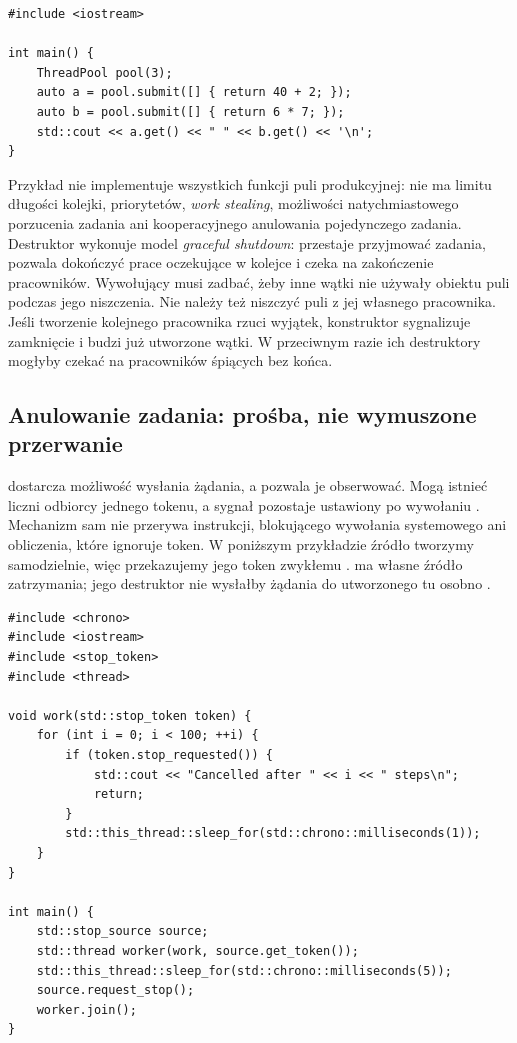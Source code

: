 \begin{lstlisting}[caption={Użycie puli i odbiór wyników; dołącz do programu z klasą ThreadPool.}]
#include <iostream>

int main() {
    ThreadPool pool(3);
    auto a = pool.submit([] { return 40 + 2; });
    auto b = pool.submit([] { return 6 * 7; });
    std::cout << a.get() << " " << b.get() << '\n';
}
\end{lstlisting}

Przykład nie implementuje wszystkich funkcji puli produkcyjnej:
nie ma limitu długości kolejki, priorytetów, \emph{work stealing},
możliwości natychmiastowego porzucenia zadania ani kooperacyjnego
anulowania pojedynczego zadania. Destruktor wykonuje model
\emph{graceful shutdown}: przestaje przyjmować zadania, pozwala
dokończyć prace oczekujące w kolejce i czeka na zakończenie pracowników.
Wywołujący musi zadbać, żeby inne wątki nie używały obiektu puli podczas
jego niszczenia. Nie należy też niszczyć puli z jej własnego pracownika.
Jeśli tworzenie kolejnego pracownika rzuci wyjątek, konstruktor
sygnalizuje zamknięcie i budzi już utworzone wątki. W przeciwnym razie
ich destruktory mogłyby czekać na pracowników śpiących bez końca.


\subsection{Anulowanie zadania: prośba, nie wymuszone przerwanie}

 dostarcza możliwość wysłania żądania, a
 pozwala je obserwować. Mogą istnieć liczni
odbiorcy jednego tokenu, a sygnał pozostaje ustawiony po wywołaniu
. Mechanizm sam nie przerywa instrukcji,
blokującego wywołania systemowego ani obliczenia, które ignoruje token.
W poniższym przykładzie źródło tworzymy samodzielnie, więc przekazujemy
jego token zwykłemu .  ma własne
źródło zatrzymania; jego destruktor nie wysłałby żądania do utworzonego
tu osobno .

\begin{lstlisting}[caption={Jedna prośba o zatrzymanie i kilka punktów kontroli.}]
#include <chrono>
#include <iostream>
#include <stop_token>
#include <thread>

void work(std::stop_token token) {
    for (int i = 0; i < 100; ++i) {
        if (token.stop_requested()) {
            std::cout << "Cancelled after " << i << " steps\n";
            return;
        }
        std::this_thread::sleep_for(std::chrono::milliseconds(1));
    }
}

int main() {
    std::stop_source source;
    std::thread worker(work, source.get_token());
    std::this_thread::sleep_for(std::chrono::milliseconds(5));
    source.request_stop();
    worker.join();
}
\end{lstlisting}

